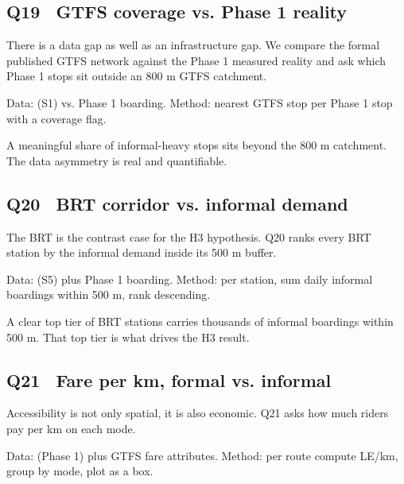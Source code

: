 \subsection{Q19 \textbullet\ GTFS coverage vs. Phase 1 reality}

There is a data gap as well as an infrastructure gap. We compare the
formal published GTFS network against the Phase 1 measured reality and
ask which Phase 1 stops sit outside an 800 m GTFS catchment.

Data:  (S1) vs. Phase 1 boarding. Method: nearest
GTFS stop per Phase 1 stop with a coverage flag.


A meaningful share of informal-heavy stops sits beyond the 800 m
catchment. The data asymmetry is real and quantifiable.

\subsection{Q20 \textbullet\ BRT corridor vs. informal demand}

The BRT is the contrast case for the H3 hypothesis. Q20 ranks every
BRT station by the informal demand inside its 500 m buffer.

Data:  (S5) plus Phase 1 boarding. Method: per
station, sum daily informal boardings within 500 m, rank descending.


A clear top tier of BRT stations carries thousands of informal
boardings within 500 m. That top tier is what drives the H3 result.

\subsection{Q21 \textbullet\ Fare per km, formal vs. informal}

Accessibility is not only spatial, it is also economic. Q21 asks how
much riders pay per km on each mode.

Data:  (Phase 1) plus GTFS fare attributes.
Method: per route compute LE/km, group by mode, plot as a box.

